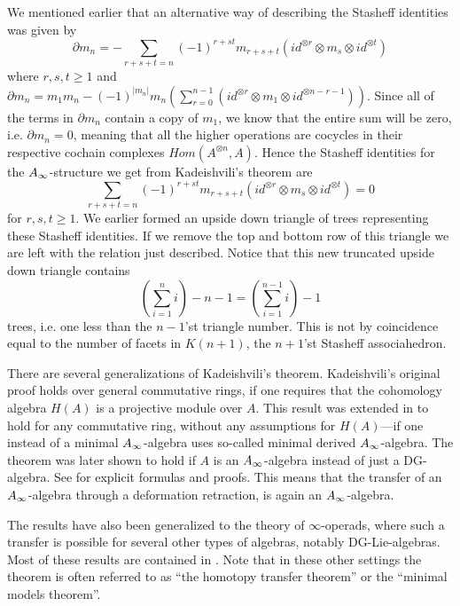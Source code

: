 We mentioned earlier that an alternative way of describing the Stasheff identities was given by 
\begin{equation*}
    \partial m_n = - \sum_{r+s+t=n}(-1)^{r+st}m_{r+s+t}(id^{\otimes r}\otimes m_s\otimes id^{\otimes t})
\end{equation*}
where $r,s,t\geq 1$ and $\partial m_n = m_1m_n - (-1)^{|m_n|}m_n\left(\sum_{r=0}^{n-1}(id^{\otimes r}\otimes m_1\otimes id^{\otimes n-r-1})\right)$. Since all of the terms in $\partial m_n$ contain a copy of $m_1$, we know that the entire sum will be zero, i.e. $\partial m_n = 0$, meaning that all the higher operations are cocycles in their respective cochain complexes $Hom(A^{\otimes n}, A)$. Hence the Stasheff identities for the $A_{\infty}$-structure we get from Kadeishvili's theorem are
\begin{equation*}
    \sum_{r+s+t=n}(-1)^{r+st}m_{r+s+t}(id^{\otimes r}\otimes m_s\otimes id^{\otimes t}) = 0
\end{equation*}
for $r, s, t\geq 1$. We earlier formed an upside down triangle of trees representing these Stasheff identities. If we remove the top and bottom row of this triangle we are left with the relation just described. Notice that this new truncated upside down triangle contains 
\begin{equation*}
    \left(\sum_{i=1}^n i\right) - n-1 = \left(\sum_{i=1}^{n-1} i\right) -1
\end{equation*}
trees, i.e. one less than the $n-1$'st triangle number. This is not by coincidence equal to the number of facets in $K(n+1)$, the $n+1$'st Stasheff associahedron. 



\begin{remark}
There are several generalizations of Kadeishvili's theorem. Kadeishvili's original proof holds over general commutative rings, if one requires that the cohomology algebra $H(A)$ is a projective module over $A$. This result was extended in \cite{Sagave} to hold for any commutative ring, without any assumptions for $H(A)$---if one instead of a minimal $A_{\infty}$-algebra uses so-called minimal derived $A_{\infty}$-algebra. The theorem was later shown to hold if $A$ is an $A_{\infty}$-algebra instead of just a DG-algebra. See \cite{transfer} for explicit formulas and proofs. This means that the transfer of an $A_{\infty}$-algebra through a deformation retraction, is again an $A_{\infty}$-algebra.

The results have also been generalized to the theory of $\infty$-operads, where such a transfer is possible for several other types of algebras, notably DG-Lie-algebras. Most of these results are contained in \cite{operads}. Note that in these other settings the theorem is often referred to as ``the homotopy transfer theorem'' or the ``minimal models theorem''. 
\end{remark}






